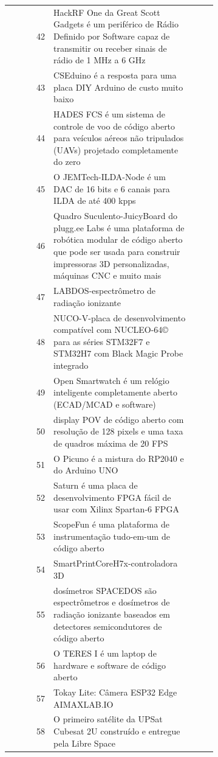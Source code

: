 \begin{longtable}{@{}r>{\raggedright\arraybackslash}p{0.68\linewidth}r@{}}
42 & HackRF One da Great Scott Gadgets é um periférico de Rádio Definido por Software capaz de transmitir ou receber sinais de rádio de 1 MHz a 6 GHz & \pageref{fig:42} \\
43 & CSEduino é a resposta para uma placa DIY Arduino de custo muito baixo & \pageref{fig:43} \\
44 & HADES FCS é um sistema de controle de voo de código aberto para veículos aéreos não tripulados (UAVs) projetado completamente do zero & \pageref{fig:44} \\
45 & O JEMTech-ILDA-Node é um DAC de 16 bits e 6 canais para ILDA de até 400 kpps & \pageref{fig:45} \\
46 & Quadro Suculento-JuicyBoard do plugg.ee Labs é uma plataforma de robótica modular de código aberto que pode ser usada para construir impressoras 3D personalizadas, máquinas CNC e muito mais & \pageref{fig:46} \\
47 & LABDOS-espectrômetro de radiação ionizante & \pageref{fig:47} \\
48 & NUCO-V-placa de desenvolvimento compatível com NUCLEO-64© para as séries STM32F7 e STM32H7 com Black Magic Probe integrado & \pageref{fig:48} \\
49 & Open Smartwatch é um relógio inteligente completamente aberto (ECAD/MCAD e software) & \pageref{fig:49} \\
50 & display POV de código aberto com resolução de 128 pixels e uma taxa de quadros máxima de 20 FPS & \pageref{fig:50} \\
51 & O Picuno é a mistura do RP2040 e do Arduino UNO & \pageref{fig:51} \\
52 & Saturn é uma placa de desenvolvimento FPGA fácil de usar com Xilinx Spartan-6 FPGA & \pageref{fig:52} \\
53 & ScopeFun é uma plataforma de instrumentação tudo-em-um de código aberto & \pageref{fig:53} \\
54 & SmartPrintCoreH7x-controladora 3D & \pageref{fig:54} \\
55 & dosímetros SPACEDOS são espectrômetros e dosímetros de radiação ionizante baseados em detectores semicondutores de código aberto & \pageref{fig:55} \\
56 & O TERES I é um laptop de hardware e software de código aberto & \pageref{fig:56} \\
57 & Tokay Lite: Câmera ESP32 Edge AIMAXLAB.IO & \pageref{fig:57} \\
58 & O primeiro satélite da UPSat Cubesat 2U construído e entregue pela Libre Space & \pageref{fig:58} \\

\end{longtable}
